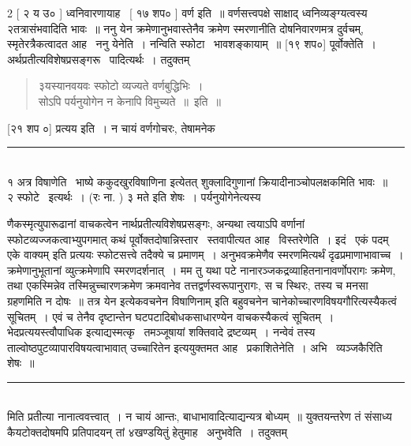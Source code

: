 \documentclass[11pt, openany]{book}
\begin{document}
\begin{multicols}{2}
[ २ य उ० ] ध्वनिवारणायाह \textendash\ [ १७ शप० ] वर्ण इति~॥ वर्णसत्त्वपक्षे साक्षाद् ध्वनिव्यङ्ग्यत्वस्य २तत्रासंभवादिति भावः~॥ ननु येन क्रमेणानुभवास्तेनैव क्रमेण स्मरणानीति दोषनिवारणमत्र दुर्वचम्, स्मृतेरत्रैकत्वादत आह \textendash\ ननु येनेति~। नन्विति स्फोटा \textendash\ भावशङ्कायाम्~॥ [१९ शप०] पूर्वोक्तेति~। अर्थप्रतीत्यविशेषप्रसङ्गरू \textendash\ पादित्यर्थः~।  तदुक्तम् \textendash\

\begin{quote}
{\qt ३यस्यानवयवः स्फोटो व्यज्यते वर्णबुद्धिभिः~।\\
सोऽपि पर्यनुयोगेन न केनापि विमुच्यते~॥~इति~॥}
\end{quote}

[२१ शप ०] प्रत्यय इति~। न चायं वर्णगोचरः, तेषामनेक \textendash\ 

\noindent
\rule{1\linewidth}{0.5pt}\\

१ अत्र विषाणेति \textendash\ भाष्ये {\qt ककुदखुरविषाणिना} इत्येतत् शुक्लादिगुणानां क्रियादीनाञ्चोपलक्षकमिति भावः~॥\\

२ स्फोटे \textendash\ इत्यर्थः~। (रः ना. ) ३ मते इति शेषः~। पर्यनुयोगेनेत्यस्य

\columnbreak

\noindent
णैकस्मृत्युपारूढानां वाचकत्वेन नार्थप्रतीत्यविशेषप्रसङ्गः, अन्यथा त्वयाऽपि वर्णानां स्फोटव्यज्जकत्वाभ्युपगमात् कथं पूर्वोक्तदोषान्निस्तार \textendash\ स्तवापीत्यत आह \textendash\ विस्तरेणेति~। इदं \textendash\ {\qt एकं पदम्} {\qt एके वाक्यम्} इति प्रत्ययः स्फोटसत्त्वे तदैक्ये च प्रमाणम्~। अनुभवक्रमेणैव स्मरणमित्यर्थं दृढप्रमाणाभावाच्च~। क्रमेणानुभूतानां व्युत्क्रमेणापि स्मरणदर्शनात्~। मम तु यथा पटे नानारञ्जकद्रव्याहितनानावर्णोपरागः क्रमेण, तथा एकस्मिन्नेव तस्मिन्नुच्चारणक्रमेण क्रमवानेव तत्तद्वर्णस्वरूपानुरागः, स च स्थिरः, तस्य च मनसा ग्रहणमिति न दोषः~॥ तत्र {\qt येन} इत्येकवचनेन {\qt विषाणिनाम्} इति बहुवचनेन चानेकोच्चारणविषयगौरित्यस्यैकत्वं सूचितम्~। एवं च तेनैव दृष्टान्तेन घटपटादिबोधकसाधारण्येन वाचकस्यैकत्वं सूचितम्~। भेदप्रत्ययस्त्वौपाधिक इत्याद्यस्मत्कृ \textendash\ तमञ्जूषायां शक्तिवादे द्रष्टव्यम्~। नन्वेवं तस्य ताल्वोष्ठपुटव्यापारविषयत्वाभावात् {\qt उच्चारितेन} इत्ययुक्तमत आह \textendash\ प्रकाशितेनेति~। अभि \textendash\ व्यञ्जकैरिति शेषः~॥

\noindent
\rule{1\linewidth}{0.5pt}\\

\noindent
मिति प्रतीत्या नानात्ववत्त्वात्~। न चायं आन्तः, बाधाभावादित्याद्यन्यत्र बोध्यम्~॥ युक्तयन्तरेण तं संसाध्य कैयटोक्तदोषमपि प्रतिपादयन् तां ४खण्डयितुं हेतुमाह \textendash\ अनुभवेति~। तदुक्तम् \textendash\ 


\end{multicols}
\end{document}
